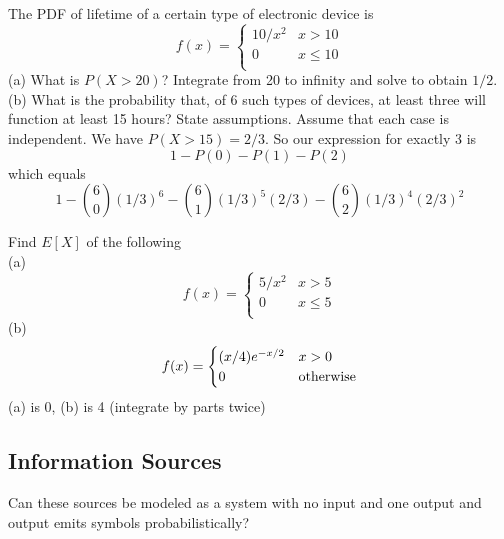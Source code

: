 \documentclass[11pt]{article}
\theoremstyle{definition}
\begin{document}
\example The PDF of lifetime of a certain type of electronic device is
\begin{equation*}
f(x) = \begin{cases}
10/x^2&  x > 10 \\
0 & x \leq 10 \\
\end{cases}
\end{equation*}
(a) What is $P(X > 20)$? Integrate from 20 to infinity and solve to obtain $1/2$. \\
(b) What is the probability that, of 6 such types of devices, at least three will function at least 15 hours? State assumptions. Assume that each case is independent. We have $P(X > 15) = 2/3$. So our expression for exactly 3 is $$1 - P(0) - P(1) - P(2)$$which equals $$1 - \binom{6}{0}(1/3)^6 - \binom{6}{1}(1/3)^5 (2/3) - \binom{6}{2} (1/3)^4 (2/3)^2$$

\example Find $E[X]$ of the following \\
(a) \begin{equation*}
f(x) = \begin{cases}
5/x^2&  x > 5 \\
0 & x \leq 5 \\
\end{cases}
\end{equation*}
(b) \begin{equation*}
f(x) = \begin{cases}
(x/4)e^{-x/2}&  x > 0 \\
0 & $otherwise$ \\
\end{cases}
\end{equation*}
(a) is 0, (b) is 4 (integrate by parts twice)

\subsection{Information Sources}

Can these sources be modeled as a system with no input and one output and output emits symbols probabilistically?
\end{document}

